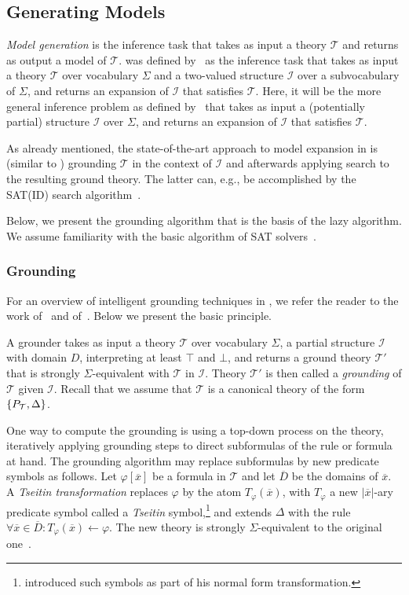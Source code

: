 \documentclass[11pt]{article}
\newcommand{\m}[1]{\ensuremath{#1}\xspace}
\newcommand{\lrule}{\m{\leftarrow}}
\newcommand{\true}{\m{\top}}
\newcommand{\false}{\m{\bot}}
\newcommand{\voc}{\m{\Sigma}}
\newcommand{\I}{\m{\mathcal{I}}}
\newcommand{\theory}{\m{\mathcal{T}}}
\newcommand{\D}{\m{\Delta}}
\newcommand{\f}{\m{\varphi}}
\newcommand{\xxx}{\m{\overline{x}}}
\newcommand{\DDD}{\m{\overline{D}}}
\newcommand{\typed}[2]{\m{#1\in #2:}}
\newcommand{\logicname}[1]{\text{\sc #1}\xspace}
\newcommand{\foid}{\logicname{FO(\ensuremath{ID})}}
\theoremstyle{plain}
\theoremstyle{definition}
\theoremstyle{example_basic}
\theoremstyle{example_contd}
\theoremstyle{plain}
\newcommand{\pt}{\ensuremath{P_\text{\theory}}\xspace}
\newcommand{\change}[1]{#1}
\begin{document}
\subsection{Generating Models}
\emph{Model generation} is the inference task that takes as input a theory \theory and returns as output a model of \theory. \MX was defined by~ as the inference task that takes as input a theory \theory over vocabulary \voc and a two-valued structure \I over a subvocabulary of $\voc$, and returns an expansion \M of \I that satisfies \theory. Here, it will be the more general inference problem as defined by~ that takes as input a (potentially partial) structure \I over \voc, and returns an expansion \M of \I that satisfies \theory.

As already mentioned, the state-of-the-art approach to model expansion in \foid is (similar to \ASP) grounding \theory in the context of \I and afterwards applying search to the resulting ground theory. The latter can, e.g., be accomplished by the SAT(ID) search algorithm~.

Below, we present the grounding algorithm that is the basis of the lazy \MX algorithm.
We assume familiarity with the basic \CDCL algorithm of SAT solvers~\cite{faia/SilvaLM09}.


\subsubsection{Grounding}
For an overview of intelligent grounding techniques in \foid, we refer the reader to the work of~ and of~. Below we present the basic principle.

A grounder takes as input a theory \theory over vocabulary \voc, a partial structure \I with domain $D$, interpreting at least \true and \false, and returns a ground theory $\theory'$ that is strongly $\voc$-equivalent with \theory in \I.  Theory $\theory'$ is then called a \emph{grounding} of \theory given \I. Recall that we assume that  \theory is a canonical theory of the form $\{\pt, \D\}$. 

One way to compute the  grounding is using a top-down process on the theory,
iteratively applying grounding steps to direct subformulas of the rule or formula at hand. The grounding algorithm may replace subformulas by new predicate symbols as follows. Let $\f[\xxx]$ be a formula in \theory and let \DDD be the domains of \xxx. A \emph{Tseitin transformation} replaces \f by the atom $T_{\f}(\xxx)$, with $T_\f$ a new $|\xxx|$-ary predicate symbol called a \emph{Tseitin} symbol,\footnote{\change{ introduced such symbols as part of his normal form transformation.}} and extends \D with the rule $\forall \typed{\xxx}{\DDD} T_{\f}(\xxx) \lrule \f$. The new theory is strongly \voc-equivalent to the original one~.
\end{document}
